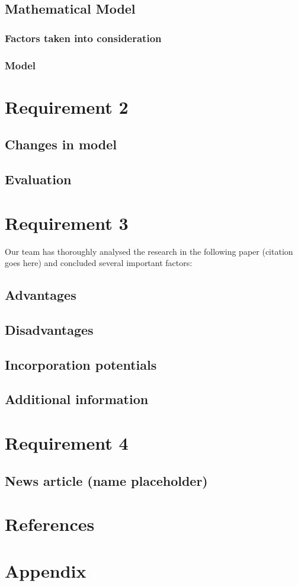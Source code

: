 \documentclass[12pt]{article}
\begin{document}
\subsection{Mathematical Model}
\subsubsection{Factors taken into consideration}

\subsubsection{Model}


\section{Requirement 2}
\subsection{Changes in model}

\subsection{Evaluation}


\section{Requirement 3}
Our team has thoroughly analysed the research in the following paper (citation goes here) and concluded several important factors:
\subsection{Advantages}

\subsection{Disadvantages}

\subsection{Incorporation potentials}

\subsection{Additional information}


\section{Requirement 4}
\subsection{News article (name placeholder)}


\section{References}


\section{Appendix}
\end{document}
